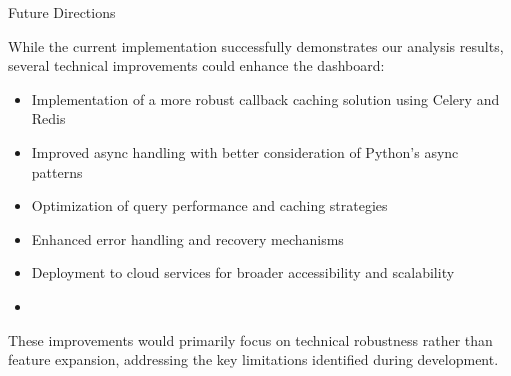 \begin{section}{Future Directions}
	\label{sec:implementation-future-directions}

	While the current implementation successfully demonstrates our analysis results, several technical improvements could enhance the dashboard:

	\begin{itemize}
		\item Implementation of a more robust callback caching solution using Celery and Redis
		\item Improved async handling with better consideration of Python's async patterns
		\item Optimization of query performance and caching strategies
		\item Enhanced error handling and recovery mechanisms
		\item Deployment to cloud services for broader accessibility and scalability
		\item {}
	\end{itemize}

	These improvements would primarily focus on technical robustness rather than feature expansion, addressing the key limitations identified during development.

\end{section}
